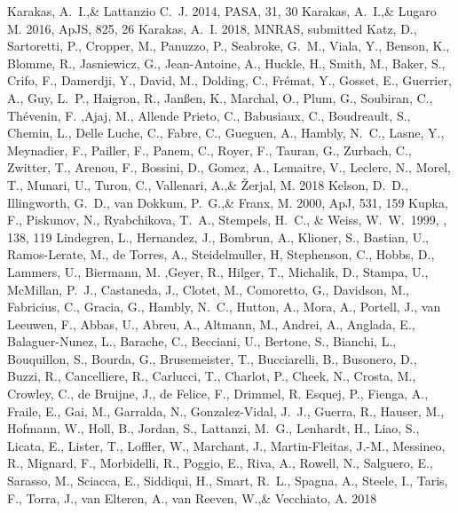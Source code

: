\documentclass[a4paper,fleqn,usenatbib]{mnras}
\begin{document}
\begin{thebibliography}{99}
Karakas, A.~I.,\& Lattanzio C.~J. 2014, 
PASA, 31, 30
Karakas, A.~I.,\& Lugaro M. 2016, 
ApJS, 825, 26
Karakas, A.~I. 2018, 
MNRAS, submitted
Katz, D., Sartoretti, P., Cropper, M., Panuzzo, P., Seabroke, G.~M., Viala, Y., Benson, K., Blomme, R., Jasniewicz, G., Jean-Antoine, A., Huckle, H., Smith, M., Baker, S., Crifo, F., Damerdji, Y., David, M., Dolding, C., Fr{\'e}mat, Y., Gosset, E., Guerrier, A., Guy, L.~P., Haigron, R., Jan{\ss}en, K., Marchal, O., Plum, G., Soubiran, C., Th{\'e}venin, F. ,Ajaj, M., Allende Prieto, C., Babusiaux, C., Boudreault, S., Chemin, L., Delle Luche, C., Fabre, C., Gueguen, A., Hambly, N.~C., Lasne, Y., Meynadier, F., Pailler, F., Panem, C., Royer, F., Tauran, G., Zurbach, C., Zwitter, T., Arenou, F., Bossini, D., Gomez, A., Lemaitre, V., Leclerc, N., Morel, T., Munari, U., Turon, C., Vallenari, A.,\& {\v Z}erjal, M. 2018
Kelson, D.~D., Illingworth, G.~D., van Dokkum, P.~G.,\& Franx, M. 2000, ApJ, 531, 159
 Kupka, F., Piskunov, N., Ryabchikova, T.~A., Stempels, H.~C., \& Weiss, W.~W.\ 1999, \aaps, 138, 119 
Lindegren, L., Hernandez, J., Bombrun, A., Klioner, S., Bastian, U., Ramos-Lerate, M., de Torres, A., Steidelmuller, H, Stephenson, C., Hobbs, D., Lammers, U., Biermann, M. ,Geyer, R., Hilger, T., Michalik, D., Stampa, U., McMillan, P.~J., Castaneda, J., Clotet, M., Comoretto, G., Davidson, M., Fabricius, C., Gracia, G., Hambly, N.~C., Hutton, A., Mora, A., Portell, J., van Leeuwen, F., Abbas, U., Abreu, A., Altmann, M., Andrei, A., Anglada, E., Balaguer-Nunez, L., Barache, C., Becciani, U., Bertone, S., Bianchi, L., Bouquillon, S., Bourda, G., Brusemeister, T., Bucciarelli, B., Busonero, D., Buzzi, R., Cancelliere, R., Carlucci, T., Charlot, P., Cheek, N., Crosta, M., Crowley, C., de Bruijne, J., de Felice, F., Drimmel, R. Esquej, P., Fienga, A., Fraile, E., Gai, M., Garralda, N., Gonzalez-Vidal, J.~J., Guerra, R., Hauser, M., Hofmann, W., Holl, B., Jordan, S., Lattanzi, M.~G., Lenhardt, H., Liao, S., Licata, E., Lister, T., Loffler, W., Marchant, J., Martin-Fleitas, J.-M., Messineo, R., Mignard, F., Morbidelli, R., Poggio, E., Riva, A., Rowell, N., Salguero, E., Sarasso, M., Sciacca, E., Siddiqui, H., Smart, R.~L., Spagna, A., Steele, I., Taris, F., Torra, J., van Elteren, A., van Reeven, W.,\& Vecchiato, A. 2018

\end{thebibliography}
\end{document}

